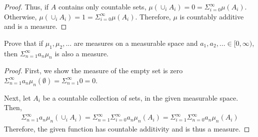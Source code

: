 \documentclass[10pt]{article}
\newenvironment{problem}[2][Problem]{\begin{trivlist}
		\item[\hskip \labelsep {\bfseries #1}\hskip \labelsep {\bfseries #2.}]}{\end{trivlist}}
\begin{document}
\begin{problem}{1}
\begin{problem}{3}
\begin{proof}
				Thus, if $A$ contains only countable sets, $\mu(\cup_i A_i) = 0 = \Sigma_{i=0}^\infty \mu(A_i)$. Otherwise, $\mu(\cup_i A_i) = 1 = \Sigma_{i=0}^\infty \mu(A_i)$. Therefore, $\mu$ is countably additive and is a measure.
			\end{proof}
		\end{problem}
		
		\begin{problem}{5}
			Prove that if $\mu_1, \mu_2 , . . .$ are
			measures on a measurable space and $a_1, a_2 , ... \in [0, \infty)$, then $\Sigma_{n=1}^\infty a_n\mu_n$ is also a measure.
			\begin{proof}
				First, we show the measure of the empty set is zero $\Sigma_{n=1}^\infty a_n\mu_n(\emptyset) = \Sigma_{n=1}^\infty 0 = 0$.
				
				Next, let $A_i$ be a countable collection of sets, in the given measurable space. Then, 
				\begin{align*}
					\Sigma_{n=1}^\infty a_n\mu_n(\cup_i A_i) = \Sigma_{n=1}^\infty \Sigma_{i=0}^\infty a_n\mu_n(A_i) = \Sigma_{i=1}^\infty \Sigma_{n=0}^\infty a_n\mu_n(A_i)
				\end{align*}
				Therefore, the given function has countable additivity and is thus a measure.
			\end{proof}
		\end{problem}
	\end{problem}
	
\end{document}
